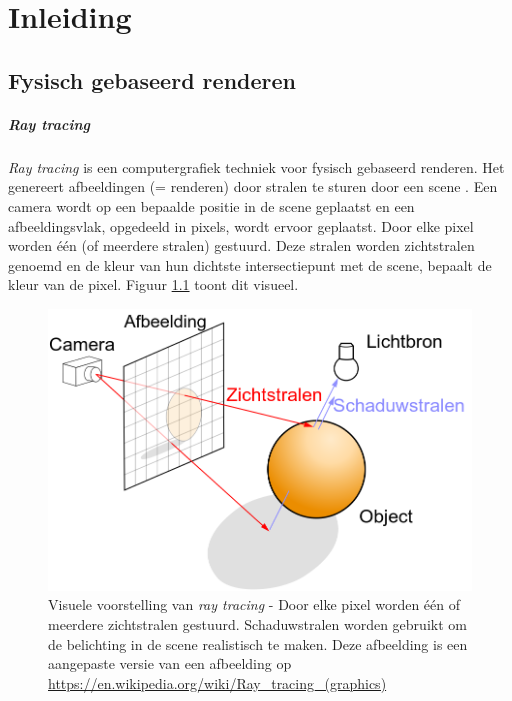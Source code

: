 \chapter{Inleiding}
\label{hoofdstuk:inleiding}

\section{Fysisch gebaseerd renderen}
\paragraph{Ray tracing}
\textit{Ray tracing} is een computergrafiek techniek voor fysisch gebaseerd renderen. Het genereert afbeeldingen (= renderen) door stralen te sturen door een scene \cite{groundup}. Een camera wordt op een bepaalde positie in de scene geplaatst en een afbeeldingsvlak, opgedeeld in pixels, wordt ervoor geplaatst. Door elke pixel worden één (of meerdere stralen) gestuurd. Deze stralen worden zichtstralen genoemd en de kleur van hun dichtste intersectiepunt met de scene, bepaalt de kleur van de pixel. Figuur \ref{fig:raytracing} toont dit visueel.\\

\begin{figure}
    \centering
    \includegraphics[width=0.5\linewidth]{img/ray-tracing}
    \caption[Visuele voorstelling van \textit{ray tracing}]%
{Visuele voorstelling van \textit{ray tracing} - \small Door elke pixel worden één of meerdere zichtstralen gestuurd. Schaduwstralen worden gebruikt om de belichting in de scene realistisch te maken. Deze afbeelding is een aangepaste versie van een afbeelding op \url{https://en.wikipedia.org/wiki/Ray_tracing_(graphics)}}
    \label{fig:raytracing}    
\end{figure}

